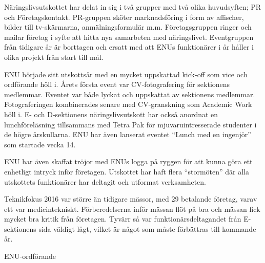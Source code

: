 \documentclass[../_main/handlingar.tex]{subfiles}
\begin{document}

Näringslivsutskottet har delat in sig i två grupper med två olika huvudsyften; PR och Företagskontakt. PR-gruppen sköter marknadsföring i form av affischer, bilder till tv-skärmarna, anmälningsformulär m.m. Företagsgruppen ringer och mailar företag i syfte att hitta nya samarbeten med näringslivet. Eventgruppen från tidigare år är borttagen och ersatt med att ENUs funktionärer i år håller i olika projekt från start till mål.

ENU började sitt utskottsår med en mycket uppskattad kick-off som vice och ordförande höll i. Årets första event var CV-fotografering för sektionens medlemmar. Eventet var både lyckat och uppskattat av sektionens medlemmar. Fotograferingen kombinerades senare med CV-granskning som Academic Work höll i. E- och D-sektionens näringslivsutskott har också anordnat en lunchföreläsning tillsammans med Tetra Pak för mjuvaruintresserade studenter i de högre årskullarna. ENU har även lanserat eventet ``Lunch med en ingenjör'' som startade vecka 14.

ENU har även skaffat tröjor med ENUs logga på ryggen för att kunna göra ett enhetligt intryck inför företagen. Utskottet har haft flera ``stormöten'' där alla utskottets funktionärer har deltagit och utformat verksamheten.

Teknikfokus 2016 var större än tidigare mässor, med 29 betalande företag, varav ett var medicintekniskt. Förberedelserna inför mässan flöt på bra och mässan fick mycket bra kritik från företagen. Tyvärr så var funktionärsdeltagandet från E-sektionens sida väldigt lågt, vilket är något som måste förbättras till kommande år.

\begin{signatures}{1}
    \mvh
    \signature{Johannes Koch}{ENU-ordförande}
\end{signatures}
\end{document}
